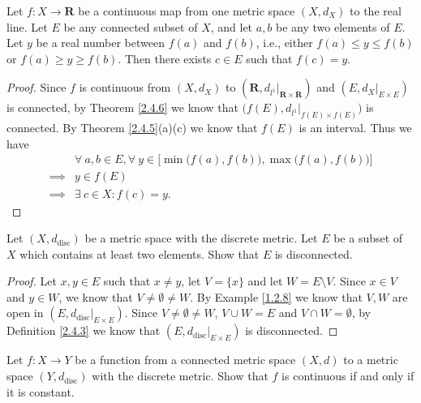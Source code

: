 \begin{corollary}\label{2.4.7}
    Let \(f : X \to \mathbf{R}\) be a continuous map from one metric space \((X, d_X)\) to the real line.
    Let \(E\) be any connected subset of \(X\), and let \(a, b\) be any two elements of \(E\).
    Let \(y\) be a real number between \(f(a)\) and \(f(b)\), i.e., either \(f(a) \leq y \leq f(b)\) or \(f(a) \geq y \geq f(b)\).
    Then there exists \(c \in E\) such that \(f(c) = y\).
\end{corollary}

\begin{proof}
    Since \(f\) is continuous from \((X, d_X)\) to \((\mathbf{R}, d_{l^1}|_{\mathbf{R} \times \mathbf{R}})\) and \((E, d_X|_{E \times E})\) is connected, by Theorem \ref{2.4.6} we know that \(\big(f(E), d_{l^1}|_{f(E) \times f(E)}\big)\) is connected.
    By Theorem \ref{2.4.5}(a)(c) we know that \(f(E)\) is an interval.
    Thus we have
    \begin{align*}
                 & \forall\ a, b \in E, \forall\ y \in \Big[\min\big(f(a), f(b)\big), \max\big(f(a), f(b)\big)\Big] \\
        \implies & y \in f(E)                                                                                       \\
        \implies & \exists\ c \in X : f(c) = y.
    \end{align*}
\end{proof}

\exercisesection

\begin{exercise}\label{ex 2.4.1}
    Let \((X, d_{\text{disc}})\) be a metric space with the discrete metric.
    Let \(E\) be a subset of \(X\) which contains at least two elements.
    Show that \(E\) is disconnected.
\end{exercise}

\begin{proof}
    Let \(x, y \in E\) such that \(x \neq y\), let \(V = \{x\}\) and let \(W = E \setminus V\).
    Since \(x \in V\) and \(y \in W\), we know that \(V \neq \emptyset \neq W\).
    By Example \ref{1.2.8} we know that \(V, W\) are open in \((E, d_{\text{disc}}|_{E \times E})\).
    Since \(V \neq \emptyset \neq W\), \(V \cup W = E\) and \(V \cap W = \emptyset\), by Definition \ref{2.4.3} we know that \((E, d_{\text{disc}}|_{E \times E})\) is disconnected.
\end{proof}

\begin{exercise}\label{ex 2.4.2}
    Let \(f : X \to Y\) be a function from a connected metric space \((X, d)\) to a metric space \((Y, d_{\text{disc}})\) with the discrete metric.
    Show that \(f\) is continuous if and only if it is constant.
\end{exercise}

